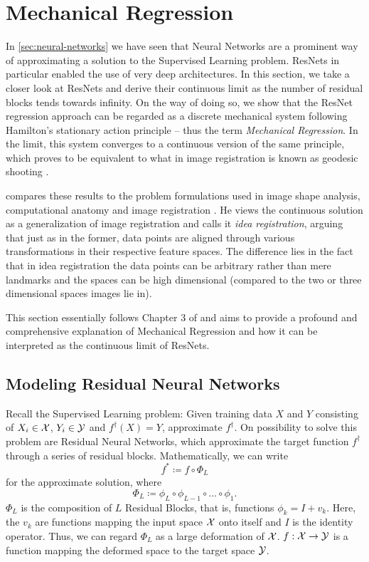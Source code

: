 \section{Mechanical Regression}
\label{sec:mechanical-regression}

In \cref{sec:neural-networks} we have seen that Neural Networks are a prominent way of approximating a solution to the Supervised Learning problem.
ResNets in particular enabled the use of very deep architectures.
In this section, we take a closer look at ResNets and derive their continuous limit as the number of residual blocks tends towards infinity.
On the way of doing so, we show that the ResNet regression approach can be regarded as a discrete mechanical system following Hamilton's stationary action principle -- thus the term \emph{Mechanical Regression}.
In the limit, this system converges to a continuous version of the same principle, which proves to be equivalent to what in image registration is known as geodesic shooting \cite{allassonniere05}.

\citet{owhadi20} compares these results to the problem formulations used in image shape analysis, computational anatomy and image registration \cite{bibid}.
He views the continuous solution as a generalization of image registration and calls it \emph{idea registration}, arguing that just as in the former, data points are aligned through various transformations in their respective feature spaces.
The difference lies in the fact that in idea registration the data points can be arbitrary rather than mere landmarks and the spaces can be high dimensional (compared to the two or three dimensional spaces images lie in).

This section essentially follows Chapter 3 of \cite{owhadi20} and aims to provide a profound and comprehensive explanation of Mechanical Regression and how it can be interpreted as the continuous limit of ResNets.

\subsection{Modeling Residual Neural Networks}

Recall the Supervised Learning problem: Given training data $X$ and $Y$ consisting of $X_i \in \mathcal{X}$, $Y_i \in \mathcal{Y}$ and $f^\dagger(X) = Y$, approximate $f^\dagger$.
On possibility to solve this problem are Residual Neural Networks, which approximate the target function $f^\dagger$ through a series of residual blocks.
Mathematically, we can write
\begin{equation}
	f^\ast \coloneqq f \circ \Phi_L 
\end{equation}
for the approximate solution, where
\begin{equation}
\Phi_L \coloneqq \phi_L \circ \phi_{L-1} \circ \ldots \circ \phi_1.
\end{equation} 
$\Phi_L$ is the composition of $L$ Residual Blocks, that is, functions $\phi_k = I + v_k$.
Here, the $v_k$ are functions mapping the input space $\mathcal{X}$ onto itself and $I$ is the identity operator.
Thus, we can regard $\Phi_L$ as a large deformation of $\mathcal{X}$.
$f: \mathcal{X} \to \mathcal{Y}$ is a function mapping the deformed space to the target space $\mathcal{Y}$.

